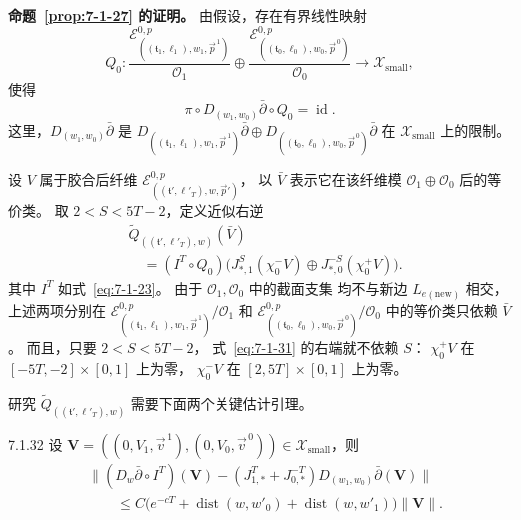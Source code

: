 
\noindent\textbf{命题~\ref{prop:7-1-27} 的证明。}
由假设，存在有界线性映射
\[
Q_0\colon
\frac{\mathcal E^{0,p}_{((\mathfrak t_1,\ell_1),w_1,\vec p^{\,1})}}
{\mathcal O_1}
\oplus
\frac{\mathcal E^{0,p}_{((\mathfrak t_0,\ell_0),w_0,\vec p^{\,0})}}
{\mathcal O_0}
\longrightarrow\mathcal X_{\mathrm{small}},
\]
使得
\begin{equation}
\pi\circ D_{(w_1,w_0)}\bar\partial\circ Q_0
=\operatorname{id}.
\tag{7.1.30}\label{eq:7-1-30}
\end{equation}
这里，$D_{(w_1,w_0)}\bar\partial$
是
$D_{((\mathfrak t_1,\ell_1),w_1,\vec p^{\,1})}\bar\partial
\oplus
D_{((\mathfrak t_0,\ell_0),w_0,\vec p^{\,0})}\bar\partial$
在 $\mathcal X_{\mathrm{small}}$ 上的限制。

设 $V$ 属于胶合后纤维
$\mathcal E^{0,p}_{((\mathfrak t',\ell'_T),w,\vec p')}$，
以 $\bar V$ 表示它在该纤维模
$\mathcal O_1\oplus\mathcal O_0$ 后的等价类。
取 $2<S<5T-2$，定义近似右逆
\begin{equation}
\begin{aligned}
&\widetilde Q_{((\mathfrak t',\ell'_T),w)}(\bar V)\\
&\quad=(I^T\circ Q_0)\bigl(
J_{*,1}^{S}(\chi_0^-V)
\oplus J_{*,0}^{-S}(\chi_0^+V)\bigr).
\end{aligned}
\tag{7.1.31}\label{eq:7-1-31}
\end{equation}
其中 $I^T$ 如式~\eqref{eq:7-1-23}。
由于 $\mathcal O_1,\mathcal O_0$ 中的截面支集
均不与新边 $L_{e(\mathrm{new})}$ 相交，
上述两项分别在
$\mathcal E^{0,p}_{((\mathfrak t_1,\ell_1),w_1,\vec p^{\,1})}/\mathcal O_1$
和
$\mathcal E^{0,p}_{((\mathfrak t_0,\ell_0),w_0,\vec p^{\,0})}/\mathcal O_0$
中的等价类只依赖 $\bar V$。
而且，只要 $2<S<5T-2$，
式~\eqref{eq:7-1-31} 的右端就不依赖 $S$：
$\chi_0^+V$ 在 $[-5T,-2]\times[0,1]$ 上为零，
$\chi_0^-V$ 在 $[2,5T]\times[0,1]$ 上为零。

研究 $\widetilde Q_{((\mathfrak t',\ell'_T),w)}$
需要下面两个关键估计引理。

\begin{lemma}{7.1.32}\label{lem:7-1-32}
设
$\mathbf V=((0,V_1,\vec v^{\,1}),(0,V_0,\vec v^{\,0}))
\in\mathcal X_{\mathrm{small}}$，则
\[
\begin{aligned}
&\bigl\|(D_w\bar\partial\circ I^T)(\mathbf V)
 -(J_{1,*}^{T}+J_{0,*}^{-T})
   D_{(w_1,w_0)}\bar\partial(\mathbf V)\bigr\|\\
&\qquad\leq
C\bigl(e^{-cT}
 +\operatorname{dist}(w,w'_0)
 +\operatorname{dist}(w,w'_1)\bigr)\|\mathbf V\|.
\end{aligned}
\]
\end{lemma}

